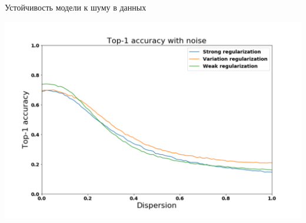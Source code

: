 \documentclass[10pt]{beamer}
\begin{document}











\begin{frame}{Устойчивость модели к шуму в данных}

\centering
\includegraphics[width=1\linewidth]{slides_t1_noise_graph.pdf}
\caption{}
\label{}

\end{frame}
\end{document}
